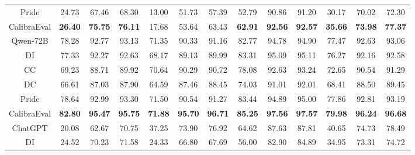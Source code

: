 \documentclass[sigconf]{acmart}
\begin{document}
\begin{table}[]
\begin{tabular}{c|ccc|ccc|ccc|ccc}
Pride                  & 24.73          & 67.46          & 68.30          & 13.00          & 51.73          & 57.39          & 52.79          & 90.86          & 91.20          & 30.17          & 70.02          & 72.30          \\
CalibraEval            & \textbf{26.40} & \textbf{75.75} & \textbf{76.11} & 17.68          & 53.64          & 63.43          & \textbf{62.91} & \textbf{92.56} & \textbf{92.57} & \textbf{35.66} & \textbf{73.98} & \textbf{77.37} \\ \hline
Qwen-72B               & 78.28          & 92.77          & 93.13          & 71.35          & 90.33          & 91.16          & 82.77          & 94.78          & 94.90           & 77.47          & 92.63          & 93.06          \\
DI                     & 77.33          & 92.27          & 92.63          & 68.17          & 89.13          & 89.99          & 83.31          & 95.09          & 95.11          & 76.27          & 92.16          & 92.58          \\
CC                     & 69.23          & 88.71          & 89.92          & 70.64          & 90.29          & 90.72          & 78.08          & 92.63          & 93.24          & 72.65          & 90.54          & 91.29          \\
DC                     & 66.61          & 87.03          & 87.90          & 64.59          & 87.46          & 88.45          & 74.03          & 91.01          & 92.01          & 68.41          & 88.50          & 89.45          \\
Pride                  & 78.64          & 92.99          & 93.30          & 71.50          & 90.54          & 91.27          & 83.44          & 94.89          & 95.00          & 77.86          & 92.81          & 93.19          \\
CalibraEval            & \textbf{82.80} & \textbf{95.47} & \textbf{95.75} & \textbf{71.88} & \textbf{95.70} & \textbf{96.71} & \textbf{85.25} & \textbf{97.56} & \textbf{97.57} & \textbf{79.98} & \textbf{96.24} & \textbf{96.68} \\ \hline
ChatGPT                & 20.08          & 62.67          & 70.75          & 37.25          & 73.90          & 76.92          & 64.62          & 87.63          & 87.81          & 40.65          & 74.73          & 78.49          \\
DI                     & 24.52          & 70.23          & 71.58          & 24.33          & 66.80           & 67.69          & 56.00          & 82.90          & 84.89          & 34.95          & 73.31          & 74.72          \\

\end{tabular}
\end{table}
\end{document}
